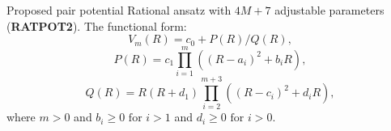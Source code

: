 \documentclass{beamer}
\begin{document}
%

\begin{frame}{Proposed pair potential}
    Rational ansatz with $4M+7$ adjustable parameters (\textbf{RATPOT2}). The functional form:
    \begin{equation}
        V_m(R)=c_0+P(R)/Q(R),
        \label{eq:ratpot2}
    \end{equation}
    \begin{equation}
        P(R)=c_1\prod_{i=1}^m ((R-a_i)^2+b_i R),
    \end{equation}
    \begin{equation}
        Q(R)=R(R+d_1)\prod_{i=2}^{m+3}((R-c_i)^2+d_i R),
    \end{equation}
    where $m>0$ and $b_i \ge 0 \text{ for } i>1$ and $d_i \ge 0 \text{ for } i>0$.
\end{frame}
\end{document}

